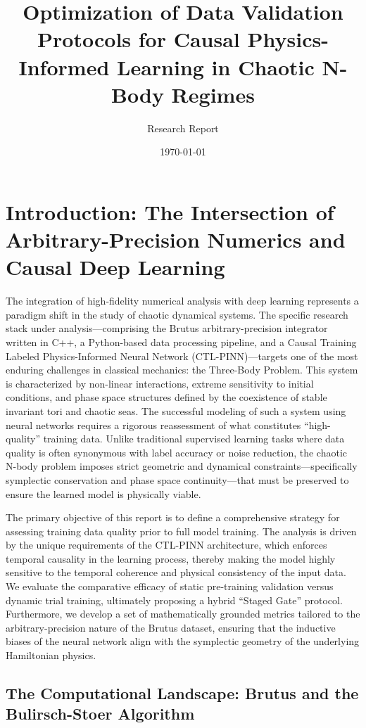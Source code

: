 \documentclass[11pt, a4paper]{article}
\title{\textbf{Optimization of Data Validation Protocols for Causal Physics-Informed Learning in Chaotic N-Body Regimes}}
\author{Research Report}
\date{\today}
\begin{document}
\maketitle

\section{Introduction: The Intersection of Arbitrary-Precision Numerics and Causal Deep Learning}

The integration of high-fidelity numerical analysis with deep learning represents a paradigm shift in the study of chaotic dynamical systems. The specific research stack under analysis—comprising the Brutus arbitrary-precision integrator written in C++, a Python-based data processing pipeline, and a Causal Training Labeled Physics-Informed Neural Network (CTL-PINN)—targets one of the most enduring challenges in classical mechanics: the Three-Body Problem. This system is characterized by non-linear interactions, extreme sensitivity to initial conditions, and phase space structures defined by the coexistence of stable invariant tori and chaotic seas. The successful modeling of such a system using neural networks requires a rigorous reassessment of what constitutes ``high-quality'' training data. Unlike traditional supervised learning tasks where data quality is often synonymous with label accuracy or noise reduction, the chaotic N-body problem imposes strict geometric and dynamical constraints—specifically symplectic conservation and phase space continuity—that must be preserved to ensure the learned model is physically viable.

The primary objective of this report is to define a comprehensive strategy for assessing training data quality prior to full model training. The analysis is driven by the unique requirements of the CTL-PINN architecture, which enforces temporal causality in the learning process, thereby making the model highly sensitive to the temporal coherence and physical consistency of the input data. We evaluate the comparative efficacy of static pre-training validation versus dynamic trial training, ultimately proposing a hybrid ``Staged Gate'' protocol. Furthermore, we develop a set of mathematically grounded metrics tailored to the arbitrary-precision nature of the Brutus dataset, ensuring that the inductive biases of the neural network align with the symplectic geometry of the underlying Hamiltonian physics.

\subsection{The Computational Landscape: Brutus and the Bulirsch-Stoer Algorithm}
\end{document}
